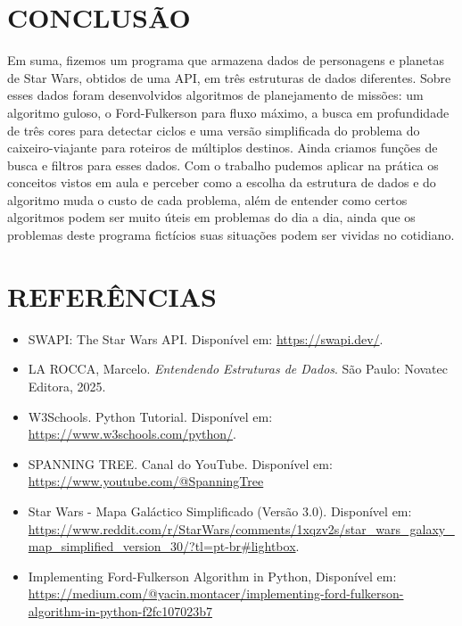 \documentclass[12pt,a4paper]{article}
\begin{document}
\section{CONCLUSÃO}
Em suma, fizemos um programa que armazena dados de personagens e planetas de Star Wars, obtidos de uma API, em três estruturas de dados diferentes. Sobre esses dados foram desenvolvidos algoritmos de planejamento de missões: um algoritmo guloso, o Ford-Fulkerson para fluxo máximo, a busca em profundidade de três cores para detectar ciclos e uma versão simplificada do problema do caixeiro-viajante para roteiros de múltiplos destinos. Ainda criamos funções de busca e filtros para esses dados.
Com o trabalho pudemos aplicar na prática os conceitos vistos em aula e perceber como a escolha da estrutura de dados e do algoritmo muda o custo de cada problema, além de entender como certos algoritmos podem ser muito úteis em problemas do dia a dia, ainda que os problemas deste programa fictícios suas situações podem ser vividas no cotidiano.

\section{REFERÊNCIAS}

\begin{itemize}
    \item SWAPI: The Star Wars API. Disponível em: \url{https://swapi.dev/}.
    \item LA ROCCA, Marcelo. \textit{Entendendo Estruturas de Dados}. São Paulo: Novatec Editora, 2025.
    \item W3Schools. Python Tutorial. Disponível em: \url{https://www.w3schools.com/python/}. 
    \item SPANNING TREE. Canal do YouTube. Disponível em: \url{https://www.youtube.com/@SpanningTree}
    \item  Star Wars - Mapa Galáctico Simplificado (Versão 3.0). Disponível em: \url{https://www.reddit.com/r/StarWars/comments/1xqzv2s/star_wars_galaxy_map_simplified_version_30/?tl=pt-br#lightbox}.
    \item Implementing Ford-Fulkerson Algorithm in Python, Disponível em: \url{https://medium.com/@yacin.montacer/implementing-ford-fulkerson-algorithm-in-python-f2fc107023b7}
\end{itemize}
\end{document}
